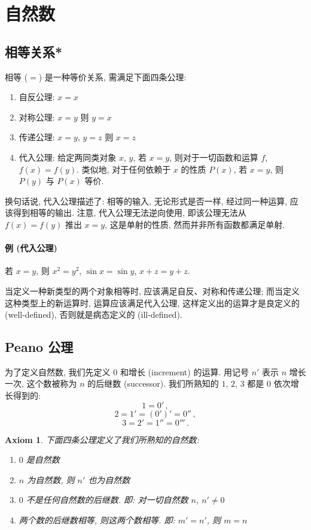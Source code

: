 \documentclass[UTF8]{ctexart}
\theoremstyle{mystyle}
\newtheorem{axiom}{Axiom}[section]
\theoremstyle{myremark}
\theoremstyle{plain}
\begin{document}
\tableofcontents

\newpage
\section{自然数}
\subsection{相等关系*} 
相等 ($ = $) 是一种等价关系, 需满足下面四条公理:
\begin{enumerate}
    \item 自反公理: $ x = x $
    \item 对称公理: $ x = y $ 则 $ y = x $
    \item 传递公理: $ x = y $, $ y = z $ 则 $ x = z $
    \item 代入公理: 给定两同类对象 $ x $, $ y $, 若 $ x = y $, 则对于一切函数和运算 $ f $, $ f(x) = f(y) $. 类似地, 对于任何依赖于 $ x $ 的性质 $ P(x) $, 若 $ x = y $, 则 $ P(y) $ 与 $ P(x) $ 等价.
\end{enumerate}

换句话说, 代入公理描述了: 相等的输入, 无论形式是否一样, 经过同一种运算, 应该得到相等的输出. 注意, 代入公理无法逆向使用, 即该公理无法从 $ f(x) = f(y) $ 推出 $ x = y $, 这是单射的性质, 然而并非所有函数都满足单射.

\paragraph{例 (代入公理)} 若 $ x = y $, 则 $ x^2 = y^2 $, $ \sin x = \sin y $, $ x + z = y + z $.

当定义一种新类型的两个对象相等时, 应该满足自反、对称和传递公理; 而当定义这种类型上的新运算时, 运算应该满足代入公理, 这样定义出的运算才是良定义的 (well-defined), 否则就是病态定义的 (ill-defined).


\subsection{Peano 公理}
为了定义自然数, 我们先定义 $ 0 $ 和增长 (increment) 的运算. 用记号 $ n' $ 表示 $ n $ 增长一次, 这个数被称为 $ n $ 的后继数 (successor). 我们所熟知的 $ 1 $, $ 2 $, $ 3 $ 都是 $ 0 $ 依次增长得到的:
\[ 1 = 0' \,,\]
\[ 2 = 1' = (0')' = 0'' \,,\]
\[ 3 = 2' = 1'' = 0''' \,.\]

\begin{axiom}
    下面四条公理定义了我们所熟知的自然数:
    \begin{enumerate}
        \item $ 0 $ 是自然数
        \item $ n $ 为自然数, 则 $ n' $ 也为自然数
        \item $ 0 $ 不是任何自然数的后继数. 即: 对一切自然数 $ n $, $ n' \neq 0 $
        \item 两个数的后继数相等, 则这两个数相等. 即: $ m' = n' $, 则 $ m = n $
    \end{enumerate} 
\end{axiom}
\end{document}
